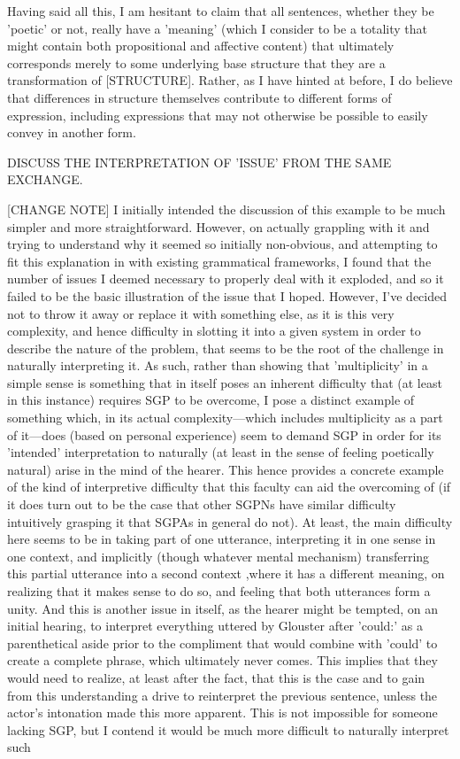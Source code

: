 \documentclass[]{article}
\begin{document}
Having said all this, I am hesitant to claim that all sentences, whether they be 'poetic' or not, really have a 'meaning' (which I consider to be a totality that might contain both propositional and affective content) that ultimately corresponds merely to some underlying base structure that they are a transformation of [STRUCTURE]. Rather, as I have hinted at before, I do believe that differences in structure themselves contribute to different forms of expression, including expressions that may not otherwise be possible to easily convey in another form.



DISCUSS THE INTERPRETATION OF 'ISSUE' FROM THE SAME EXCHANGE.



[CHANGE NOTE] I initially intended the discussion of this example to be much simpler and more straightforward. However, on actually grappling with it and trying to understand why it seemed so initially non-obvious, and attempting to fit this explanation in with existing grammatical frameworks, I found that the number of issues I deemed necessary to properly deal with it exploded, and so it failed to be the basic illustration of the issue that I hoped. However, I've decided not to throw it away or replace it with something else, as it is this very complexity, and hence difficulty in slotting it into a given system in order to describe the nature of the problem, that seems to be the root of the challenge in naturally interpreting it. As such, rather than showing that 'multiplicity' in a simple sense is something that in itself poses an inherent difficulty that (at least in this instance) requires SGP to be overcome, I pose a distinct example of something which, in its actual complexity—which includes multiplicity as a part of it—does (based on personal experience) seem to demand SGP in order for its 'intended' interpretation to naturally (at least in the sense of feeling poetically natural) arise in the mind of the hearer. This hence provides a concrete example of the kind of interpretive difficulty that this faculty can aid the overcoming of (if it does turn out to be the case that other SGPNs have similar difficulty intuitively grasping it that SGPAs in general do not). At least, the main difficulty here seems to be in taking part of one utterance, interpreting it in one sense in one context, and implicitly (though whatever mental mechanism) transferring this partial utterance into a second context ,where it has a different meaning, on realizing that it makes sense to do so, and feeling that both utterances form a unity. And this is another issue in itself, as the hearer might be tempted, on an initial hearing, to interpret everything uttered by Glouster after 'could:' as a parenthetical aside prior to the compliment that would combine with 'could' to create a complete phrase, which ultimately never comes. This implies that they would need to realize, at least after the fact, that this is the case and to gain from this understanding a drive to reinterpret the previous sentence, unless the actor's intonation made this more apparent. This is not impossible for someone lacking SGP, but I contend it would be much more difficult to naturally interpret such 
\end{document}
